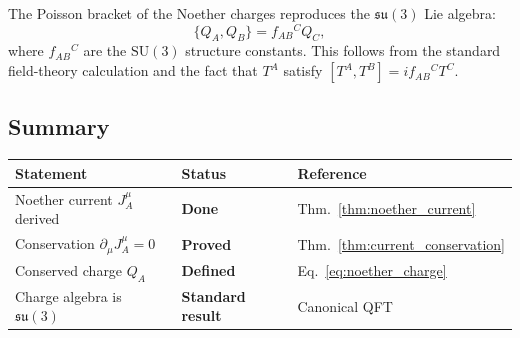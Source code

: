 The Poisson bracket of the Noether charges reproduces the $\mathfrak{su}(3)$
Lie algebra:
\begin{equation}
  \{Q_A, Q_B\} = f_{AB}{}^C Q_C,
\end{equation}
where $f_{AB}{}^C$ are the $\mathrm{SU}(3)$ structure constants.  This follows
from the standard field-theory calculation and the fact that $T^A$ satisfy
$[T^A,T^B]=if_{AB}{}^C T^C$.

\subsection{Summary}

\begin{center}
\begin{tabular}{lll}
  \hline
  Statement & Status & Reference \\
  \hline
  Noether current $J_A^\mu$ derived & \textbf{Done} & Thm.~\ref{thm:noether_current} \\
  Conservation $\partial_\mu J_A^\mu=0$ & \textbf{Proved} & Thm.~\ref{thm:current_conservation} \\
  Conserved charge $Q_A$ & \textbf{Defined} & Eq.~\eqref{eq:noether_charge} \\
  Charge algebra is $\mathfrak{su}(3)$ & \textbf{Standard result} & Canonical QFT \\
  \hline
\end{tabular}
\end{center}

